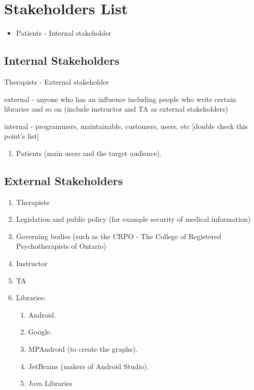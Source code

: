 \documentclass[11pt]{article}
\begin{document}
    \section{Stakeholders List}\label{sec:stakeholders-list}
    \begin{itemize}
        \item Patients - Internal stakeholder
    \end{itemize}

    \subsection{Internal Stakeholders}\label{subsec:internal-stakeholders}
    \item Therapists - External stakeholder
    \item external - anyone who has an influence\; including people who write certain libraries and so on  (include instructor and TA as external stakeholders)
    \item internal - programmers, maintainable, customers, users, etc [double check this point's list]

    \begin{enumerate}
        \item Patients (main users and the target audience).
    \end{enumerate}

    \subsection{External Stakeholders}\label{subsec:external-stakeholders}

    \begin{enumerate}
        \item Therapists
        \item Legislation and public policy (for example security of medical information)
        \item Governing bodies (such as the CRPO - The College of Registered Psychotherapists of Ontario)
        \item Instructor
        \item TA
        \item Libraries:
        \begin{enumerate}
            \item Android.
            \item Google.
            \item MPAndroid (to create the graphs).
            \item JetBrains (makers of Android Studio).
            \item Java Libraries
        \end{enumerate}
    \end{enumerate}
\end{document}
